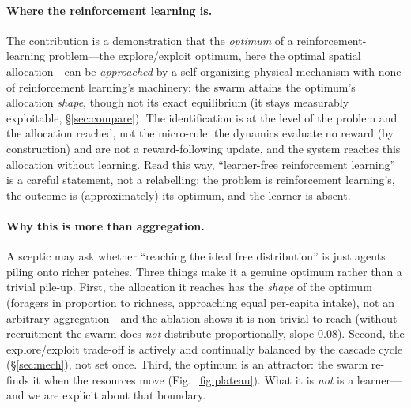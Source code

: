 \documentclass{article}
\begin{document}
\paragraph{Where the reinforcement learning is.} The contribution is a demonstration that the \emph{optimum} of
a reinforcement-learning problem---the explore/exploit optimum, here the optimal spatial allocation---can be
\emph{approached} by a self-organizing physical mechanism with none of reinforcement learning's
machinery: the swarm attains the optimum's allocation \emph{shape}, though not its exact equilibrium (it stays
measurably exploitable, \S\ref{sec:compare}). The identification is at the level of the problem and the
allocation reached, not the micro-rule: the dynamics evaluate no reward (by construction) and are not a
reward-following update, and the system reaches this allocation without learning. Read this way, ``learner-free
reinforcement learning'' is a careful statement, not a relabelling: the problem is reinforcement learning's,
the outcome is (approximately) its optimum, and the learner is absent.

\paragraph{Why this is more than aggregation.} A sceptic may ask whether ``reaching the ideal free
distribution'' is just agents piling onto richer patches. Three things make it a genuine optimum rather than a
trivial pile-up. First, the allocation it reaches has the \emph{shape} of the optimum (foragers in proportion
to richness, approaching equal per-capita intake), not an arbitrary aggregation---and the ablation shows it is
non-trivial to reach (without recruitment the swarm does \emph{not} distribute proportionally, slope $0.08$). Second, the explore/exploit trade-off is actively and
continually balanced by the cascade cycle (\S\ref{sec:mech}), not set once. Third, the optimum is an attractor:
the swarm re-finds it when the resources move (Fig.~\ref{fig:plateau}). What it is \emph{not} is a
learner---and we are explicit about that boundary.
\end{document}
